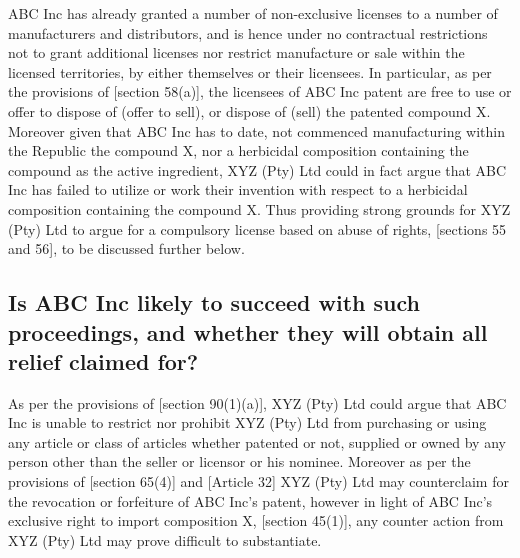 \documentclass[11pt]{article}
\begin{document}
ABC Inc has already granted a number of non-exclusive licenses to a number of manufacturers and distributors, and is hence under
no contractual restrictions not to grant additional licenses nor restrict manufacture or sale within the licensed territories, by
either themselves or their licensees. In particular, as per the provisions of [section 58(a)]\cite{rsa78_patents_act}, the licensees
of ABC Inc patent are free to use or offer to dispose of (offer to sell), or dispose of (sell) the patented compound X. Moreover
given that ABC Inc has to date, not commenced manufacturing within the Republic the compound X, nor a herbicidal composition
containing the compound as the active ingredient, XYZ (Pty) Ltd could in fact argue that ABC Inc has failed to utilize or work
their invention with respect to a herbicidal composition containing the compound X. Thus providing strong grounds for XYZ (Pty)
Ltd to argue for a compulsory license based on abuse of rights, [sections 55 and 56]\cite{rsa78_patents_act}, to be discussed
further below.
\subsection{Is ABC Inc likely to succeed with such proceedings, and whether they will obtain all relief claimed for?}
\label{sec:orgf9c56d6}
As per the provisions of [section 90(1)(a)]\cite{rsa78_patents_act}, XYZ (Pty) Ltd could argue that ABC Inc is unable to restrict nor
prohibit XYZ (Pty) Ltd from purchasing or using any article or class of articles whether patented or not, supplied or owned by any
person other than the seller or licensor or his nominee. Moreover as per the provisions of [section 65(4)]\cite{rsa78_patents_act}
and [Article 32]\cite{wto17_trips} XYZ (Pty) Ltd may counterclaim for the revocation or forfeiture of ABC Inc's patent, however in
light of ABC Inc's exclusive right to import composition X, [section 45(1)]\cite{rsa78_patents_act}, any counter action from XYZ
(Pty) Ltd may prove difficult to substantiate.\\
\end{document}
